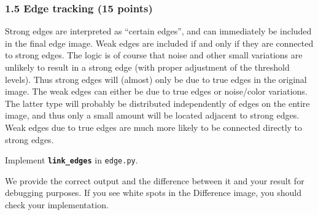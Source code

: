 \documentclass[11pt]{article}
\begin{document}
    \subsubsection{1.5 Edge tracking (15
points)}\label{edge-tracking-15-points}

Strong edges are interpreted as ``certain edges'', and can immediately
be included in the final edge image. Weak edges are included if and only
if they are connected to strong edges. The logic is of course that noise
and other small variations are unlikely to result in a strong edge (with
proper adjustment of the threshold levels). Thus strong edges will
(almost) only be due to true edges in the original image. The weak edges
can either be due to true edges or noise/color variations. The latter
type will probably be distributed independently of edges on the entire
image, and thus only a small amount will be located adjacent to strong
edges. Weak edges due to true edges are much more likely to be connected
directly to strong edges.

Implement \textbf{\texttt{link\_edges}} in \texttt{edge.py}.

We provide the correct output and the difference between it and your
result for debugging purposes. If you see white spots in the Difference
image, you should check your implementation.
\end{document}
